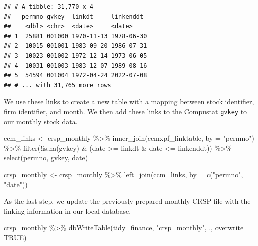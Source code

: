 \documentclass[
]{krantz}
\newenvironment{Shaded}{\begin{snugshade}}{\end{snugshade}}
\newcommand{\AttributeTok}[1]{\textcolor[rgb]{0.61,0.61,0.61}{#1}}
\newcommand{\ConstantTok}[1]{\textcolor[rgb]{0,0,0}{#1}}
\newcommand{\FunctionTok}[1]{\textcolor[rgb]{0,0,0}{#1}}
\newcommand{\NormalTok}[1]{#1}
\newcommand{\OtherTok}[1]{\textcolor[rgb]{0.37,0.37,0.37}{#1}}
\newcommand{\SpecialCharTok}[1]{\textcolor[rgb]{0,0,0}{#1}}
\newcommand{\StringTok}[1]{\textcolor[rgb]{0.5,0.5,0.5}{#1}}
\begin{document}
\begin{verbatim}
## # A tibble: 31,770 x 4
##   permno gvkey  linkdt     linkenddt 
##    <dbl> <chr>  <date>     <date>    
## 1  25881 001000 1970-11-13 1978-06-30
## 2  10015 001001 1983-09-20 1986-07-31
## 3  10023 001002 1972-12-14 1973-06-05
## 4  10031 001003 1983-12-07 1989-08-16
## 5  54594 001004 1972-04-24 2022-07-08
## # ... with 31,765 more rows
\end{verbatim}

We use these links to create a new table with a mapping between stock identifier, firm identifier, and month. We then add these links to the Compustat \texttt{gvkey} to our monthly stock data.

\begin{Shaded}
\begin{Highlighting}[]
\NormalTok{ccm\_links }\OtherTok{\textless{}{-}}\NormalTok{ crsp\_monthly }\SpecialCharTok{\%\textgreater{}\%}
  \FunctionTok{inner\_join}\NormalTok{(ccmxpf\_linktable, }\AttributeTok{by =} \StringTok{"permno"}\NormalTok{) }\SpecialCharTok{\%\textgreater{}\%}
  \FunctionTok{filter}\NormalTok{(}\SpecialCharTok{!}\FunctionTok{is.na}\NormalTok{(gvkey) }\SpecialCharTok{\&}\NormalTok{ (date }\SpecialCharTok{\textgreater{}=}\NormalTok{ linkdt }\SpecialCharTok{\&}\NormalTok{ date }\SpecialCharTok{\textless{}=}\NormalTok{ linkenddt)) }\SpecialCharTok{\%\textgreater{}\%}
  \FunctionTok{select}\NormalTok{(permno, gvkey, date)}

\NormalTok{crsp\_monthly }\OtherTok{\textless{}{-}}\NormalTok{ crsp\_monthly }\SpecialCharTok{\%\textgreater{}\%}
  \FunctionTok{left\_join}\NormalTok{(ccm\_links, }\AttributeTok{by =} \FunctionTok{c}\NormalTok{(}\StringTok{"permno"}\NormalTok{, }\StringTok{"date"}\NormalTok{))}
\end{Highlighting}
\end{Shaded}

As the last step, we update the previously prepared monthly CRSP file with the linking information in our local database.

\begin{Shaded}
\begin{Highlighting}[]
\NormalTok{crsp\_monthly }\SpecialCharTok{\%\textgreater{}\%}
  \FunctionTok{dbWriteTable}\NormalTok{(tidy\_finance, }\StringTok{"crsp\_monthly"}\NormalTok{, ., }\AttributeTok{overwrite =} \ConstantTok{TRUE}\NormalTok{)}
\end{Highlighting}
\end{Shaded}
\end{document}
